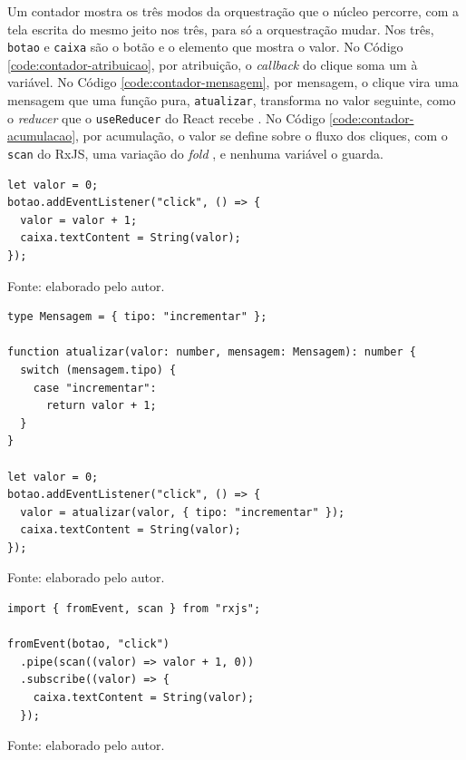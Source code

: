 Um contador mostra os três modos da orquestração que o núcleo percorre,
com a tela escrita do mesmo jeito nos três, para só a orquestração mudar.
Nos três, \texttt{botao} e \texttt{caixa} são o botão e o elemento que mostra o valor.
No Código \ref{code:contador-atribuicao}, por atribuição, o \emph{callback}
do clique soma um à variável.
No Código \ref{code:contador-mensagem}, por mensagem, o clique vira uma
mensagem que uma função pura, \texttt{atualizar}, transforma no valor seguinte,
como o \emph{reducer} que o \texttt{useReducer} do React recebe \cite{meta2026d}.
No Código \ref{code:contador-acumulacao}, por acumulação, o valor se
define sobre o fluxo dos cliques, com o \texttt{scan} do RxJS, uma variação do
\emph{fold} \cite[p. 1530]{zimmerle2025}, e nenhuma variável o guarda.

  \begin{listing}[htbp]
    \caption{O contador com a orquestração por atribuição.}
    \begin{verbatim}
let valor = 0;
botao.addEventListener("click", () => {
  valor = valor + 1;
  caixa.textContent = String(valor);
});
    \end{verbatim}
    \small Fonte: elaborado pelo autor.
    \label{code:contador-atribuicao}
  \end{listing}

  \begin{listing}[htbp]
    \caption{O contador com a orquestração por mensagem.}
    \begin{verbatim}
type Mensagem = { tipo: "incrementar" };

function atualizar(valor: number, mensagem: Mensagem): number {
  switch (mensagem.tipo) {
    case "incrementar":
      return valor + 1;
  }
}

let valor = 0;
botao.addEventListener("click", () => {
  valor = atualizar(valor, { tipo: "incrementar" });
  caixa.textContent = String(valor);
});
    \end{verbatim}
    \small Fonte: elaborado pelo autor.
    \label{code:contador-mensagem}
  \end{listing}

  \begin{listing}[htbp]
    \caption{O contador com a orquestração por acumulação, no RxJS.}
    \begin{verbatim}
import { fromEvent, scan } from "rxjs";

fromEvent(botao, "click")
  .pipe(scan((valor) => valor + 1, 0))
  .subscribe((valor) => {
    caixa.textContent = String(valor);
  });
    \end{verbatim}
    \small Fonte: elaborado pelo autor.
    \label{code:contador-acumulacao}
  \end{listing}
